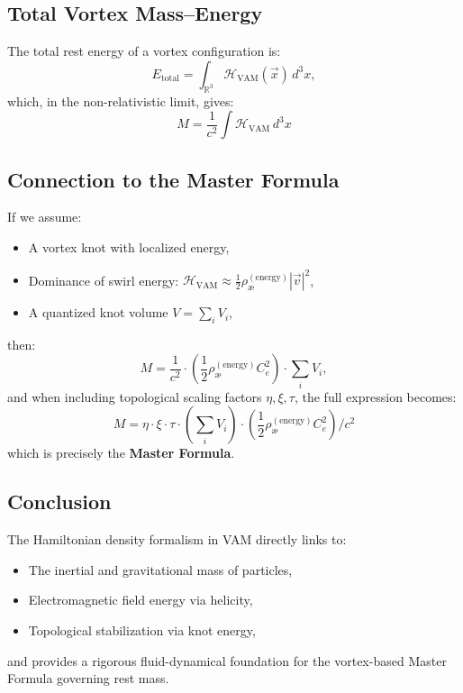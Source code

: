 \subsection*{Total Vortex Mass–Energy}

The total rest energy of a vortex configuration is:
\begin{equation}
E_\text{total} = \int_{\mathbb{R}^3} \mathcal{H}_\text{VAM}(\vec{x}) \, d^3x,
\end{equation}
which, in the non-relativistic limit, gives:
\[
M = \frac{1}{c^2} \int \mathcal{H}_\text{VAM} \, d^3x
\]

\subsection*{Connection to the Master Formula}

If we assume:
\begin{itemize}
    \item A vortex knot with localized energy,
    \item Dominance of swirl energy: \( \mathcal{H}_\text{VAM} \approx \frac{1}{2} \rho_\text{\ae}^{(\text{energy})} |\vec{v}|^2 \),
    \item A quantized knot volume \( V = \sum_i V_i \),
\end{itemize}
then:
\[
M = \frac{1}{c^2} \cdot \left( \frac{1}{2} \rho_\text{\ae}^{(\text{energy})} C_e^2 \right) \cdot \sum_i V_i,
\]
and when including topological scaling factors \( \eta, \xi, \tau \), the full expression becomes:
\[
M = \eta \cdot \xi \cdot \tau \cdot \left( \sum_i V_i \right) \cdot \left( \frac{1}{2} \rho_\text{\ae}^{(\text{energy})} C_e^2 \right) / c^2
\]
which is precisely the \textbf{Master Formula}.

\subsection*{Conclusion}

The Hamiltonian density formalism in VAM directly links to:
\begin{itemize}
    \item The inertial and gravitational mass of particles,
    \item Electromagnetic field energy via helicity,
    \item Topological stabilization via knot energy,
\end{itemize}
and provides a rigorous fluid-dynamical foundation for the vortex-based Master Formula governing rest mass.